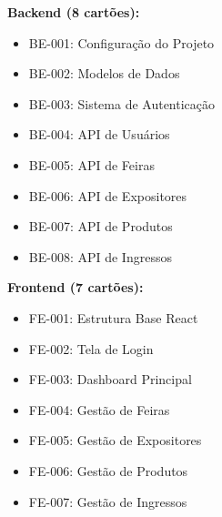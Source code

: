 \documentclass[12pt,a4paper]{article}
\begin{document}
\textbf{Backend (8 cartões):}
\begin{itemize}
    \item BE-001: Configuração do Projeto
    \item BE-002: Modelos de Dados
    \item BE-003: Sistema de Autenticação
    \item BE-004: API de Usuários
    \item BE-005: API de Feiras
    \item BE-006: API de Expositores
    \item BE-007: API de Produtos
    \item BE-008: API de Ingressos
\end{itemize}



\textbf{Frontend (7 cartões):}
\begin{itemize}
    \item FE-001: Estrutura Base React
    \item FE-002: Tela de Login
    \item FE-003: Dashboard Principal
    \item FE-004: Gestão de Feiras
    \item FE-005: Gestão de Expositores
    \item FE-006: Gestão de Produtos
    \item FE-007: Gestão de Ingressos
\end{itemize}
\end{document}
